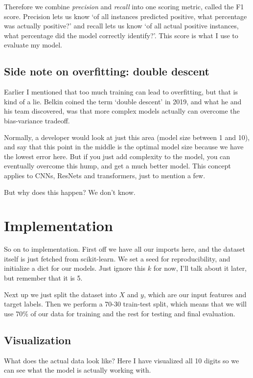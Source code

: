 \documentclass{article}
\begin{document}
Therefore we combine \textit{precision} and \textit{recall} into one scoring metric, called the F1 score. Precision lets us know `of all instances predicted positive, what percentage was actually positive?' and recall lets us know `of all actual positive instances, what percentage did the model correctly identify?'. This score is what I use to evaluate my model. 

\newpage

\subsection{Side note on overfitting: double descent}

Earlier I mentioned that too much training can lead to overfitting, but that is kind of a lie. Belkin coined the term `double descent' in 2019, and what he and his team discovered, was that more complex models actually can overcome the bias-variance tradeoff.

Normally, a developer would look at just this area (model size between 1 and 10), and say that this point in the middle is the optimal model size because we have the lowest error here. But if you just add complexity to the model, you can eventually overcome this hump, and get a much better model. This concept applies to CNNs, ResNets and transformers, just to mention a few. 

But why does this happen? We don't know. 

\section{Implementation}

So on to implementation. First off we have all our imports here, and the dataset itself is just fetched from scikit-learn. We set a seed for reproducibility, and initialize a dict for our models. Just ignore this $k $ for now, I'll talk about it later, but remember that it is 5.

Next up we just split the dataset into $X$ and $y$, which are our input features and target labels. Then we perform a 70-30 train-test split, which means that we will use 70\% of our data for training and the rest for testing and final evaluation. 

\subsection{Visualization}

What does the actual data look like? Here I have visualized all 10 digits so we can see what the model is actually working with.
\end{document}
